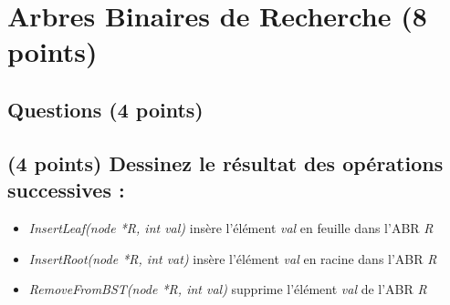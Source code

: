 \documentclass[11pt,a4paper]{article}
\begin{document}
\section{Arbres Binaires de Recherche (8 points)}

\subsection*{Questions (4 points) }

\subsection{(4 points) Dessinez le résultat des opérations successives : }

\begin{itemize}
\item \textit{InsertLeaf(node *R, int val)} insère l'élément \og \textit{val} \fg{} en feuille dans l'ABR \og \textit{R} \fg{}
\item \textit{InsertRoot(node *R, int vat)} insère l'élément \og \textit{val} \fg{} en racine dans l'ABR \og \textit{R} \fg{}
\item \textit{RemoveFromBST(node *R, int val)} supprime l'élément \og \textit{val} \fg{} de l'ABR \og \textit{R} \fg{}
\end{itemize}

\vspace*{-0.5cm}
\end{document}
